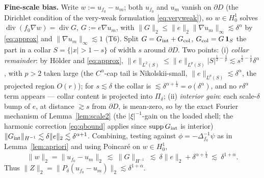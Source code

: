 \documentclass[11pt]{article}
\theoremstyle{remark}
\newcommand{\norm}[1]{\lVert #1\rVert}
\newcommand{\abs}[1]{\lvert #1\rvert}
\newcommand{\SET}[1]{\{#1\}}
\DeclareMathOperator{\diver}{div}
\DeclareMathOperator{\supp}{supp}
\begin{document}
\par\noindent\textbf{Fine-scale bias.} Write $w:=u_{f_0}-u_m$; both
$u_{f_0}$ and $u_m$ vanish on $\partial D$ (the Dirichlet condition of
the very-weak formulation \eqref{eq:veryweak}), so $w\in H^{1}_0$ solves
$\diver(f_0\nabla w)=\diver G$, $G:=e\nabla u_m$, with
$\norm{G}_2\le\norm e_2\norm{\nabla u_m}_\infty\lesssim\delta^\alpha$
by \eqref{eq:approx} and $\norm{\nabla u_m}_\infty\lesssim1$ (T6).
Split $G=G_{\rm int}+G_{\rm col}$, $G_{\rm col}=G\,\mathbf 1_{S}$ the
part in a collar $S=\SET{\abs x>1-s}$ of width $s$ around $\partial
D$. Two points:
(i) \emph{collar remainder}: by H\"older and \eqref{eq:approx},
$\norm{e}_{L^{2}(S)}\le\norm{e}_{L^{p}(S)}\abs{S}^{\frac12-\frac1p}
\lesssim s^{\frac12-\frac1p}\delta^{\alpha}$, with $p>2$ taken large
(the $C^\alpha$-cap tail is Nikolskii-small,
$\norm{e}_{L^{p}(S)}\lesssim\delta^{\alpha}$, the projected region
$O(r)$); for $s\lesssim\delta$ the collar is
$\lesssim\delta^{\alpha+\frac14}=o(\delta^{\alpha})$, and no
$r\delta^\alpha$ term appears --- collar content is projected into
$\Pi_\delta$;
(ii) \emph{interior gain}: each scale-$\delta$ bump of $e$, at
distance $\gtrsim s$ from $\partial D$, is mean-zero, so by the exact
Fourier mechanism of Lemma~\ref{lem:scale2} (the
$\abs\xi^{-1}$-gain on the loaded shell; the harmonic correction
\eqref{eq:qbound} applies since $\supp G_{\rm int}$ is interior)
$\norm{G_{\rm int}}_{H^{-1}}\lesssim\delta\norm e_2\lesssim
\delta^{\alpha+1}$. Combining, testing
against $\phi=-\Delta^{-1}_{f_0}\psi$ as in Lemma~\ref{lem:apriori}
and using Poincar\'e on $w\in H^{1}_0$,
\begin{equation}\label{eq:finebias}
\norm{w}_2=\norm{u_{f_0}-u_m}_2
\ \lesssim\ \norm{G}_{H^{-1}}
\ \lesssim\ \delta\norm{e}_2+\delta^{\alpha+\frac14}
\ \lesssim\ \delta^{1+\alpha}.
\end{equation}
Thus
$\norm Z_2=\norm{P_\delta(u_{f_0}-u_m)}_2
\lesssim\delta^{1+\alpha}$.
\end{document}
